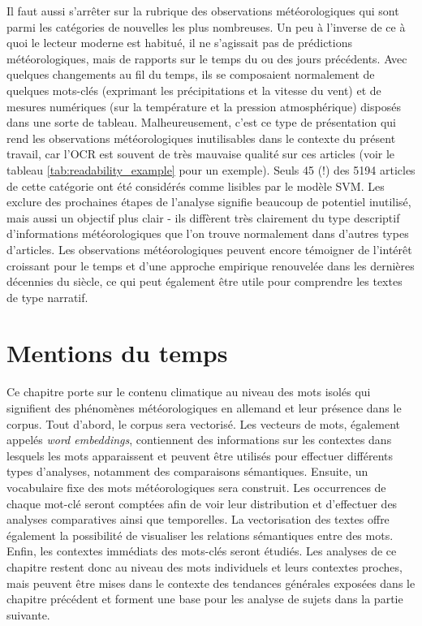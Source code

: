 \documentclass[a4paper,twoside,12pt]{article}
\begin{document}
\label{beobachtungen_riga}Il faut aussi s'arrêter sur la rubrique des observations météorologiques qui sont parmi les catégories de nouvelles les plus nombreuses. Un peu à l'inverse de ce à quoi le lecteur moderne est habitué, il ne s'agissait pas de prédictions météorologiques, mais de rapports sur le temps du ou des jours précédents. Avec quelques changements au fil du temps, ils se composaient normalement de quelques mots-clés (exprimant les précipitations et la vitesse du vent) et de mesures numériques (sur la température et la pression atmosphérique) disposés dans une sorte de tableau. Malheureusement, c'est ce type de présentation qui rend les observations météorologiques inutilisables dans le contexte du présent travail, car l'OCR est souvent de très mauvaise qualité sur ces articles (voir le tableau \ref{tab:readability_example} pour un exemple). Seuls 45 (!) des 5194 articles de cette catégorie ont été considérés comme lisibles par le modèle SVM. Les exclure des prochaines étapes de l'analyse signifie beaucoup de potentiel inutilisé, mais aussi un objectif plus clair - ils diffèrent très clairement du type descriptif d'informations météorologiques que l'on trouve normalement dans d'autres types d'articles. Les observations météorologiques peuvent encore témoigner de l'intérêt croissant pour le temps et d'une approche empirique renouvelée dans les dernières décennies du siècle, ce qui peut également être utile pour comprendre les textes de type narratif.


\clearpage




\section{Mentions du temps}\label{mentions_du_temps}

Ce chapitre porte sur le contenu \og climatique \fg{} au niveau des mots isolés qui signifient des phénomènes météorologiques en allemand et leur présence dans le corpus. Tout d'abord, le corpus sera vectorisé. Les vecteurs de mots, également appelés \textit{word embeddings}, contiennent des informations sur les contextes dans lesquels les mots apparaissent et peuvent être utilisés pour effectuer différents types d'analyses, notamment des comparaisons sémantiques. Ensuite, un vocabulaire fixe des mots \og météorologiques \fg{} sera construit. Les occurrences de chaque mot-clé seront comptées afin de voir leur distribution et d'effectuer des analyses comparatives ainsi que temporelles. La vectorisation des textes offre également la possibilité de visualiser les relations sémantiques entre des mots. Enfin, les contextes immédiats des mots-clés seront étudiés. Les analyses de ce chapitre restent donc au niveau des mots individuels et leurs contextes proches, mais peuvent être mises dans le contexte des tendances générales exposées dans le chapitre précédent et forment une base pour les analyse de sujets dans la partie suivante.
\end{document}
